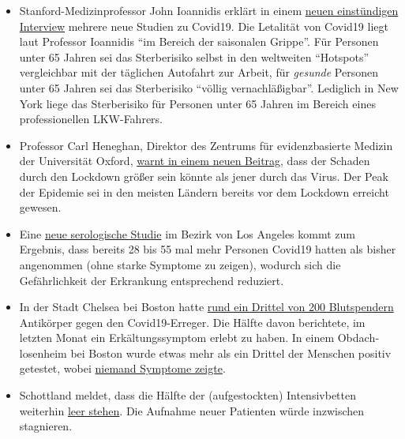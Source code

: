 \begin{itemize}
\tightlist
\item
  Stanford-Medizinprofessor John Ioannidis erklärt in einem
  \href{https://www.youtube.com/watch?v=cwPqmLoZA4s}{neuen einstündigen
  Interview} mehrere neue Studien zu Covid19. Die Letalität von Covid19
  liegt laut Professor Ioannidis ``im Bereich der saisonalen Grippe''.
  Für Personen unter 65 Jahren sei das Sterberisiko selbst in den
  weltweiten ``Hotspots'' vergleichbar mit der täglichen Autofahrt zur
  Arbeit, für \emph{gesunde} Personen unter 65 Jahren sei das
  Sterberisiko ``völlig vernachläßigbar''. Lediglich in New York liege
  das Sterberisiko für Personen unter 65 Jahren im Bereich eines
  professionellen LKW-Fahrers.
\item
  Professor Carl Heneghan, Direktor des Zentrums für evidenzbasierte
  Medizin der Universität Oxford,
  \href{https://news.yahoo.com/lockdown-damage-outweighs-coronavirus-warning-121940675.html}{warnt
  in einem neuen Beitrag}, dass der Schaden durch den Lockdown größer
  sein könnte als jener durch das Virus. Der Peak der Epidemie sei in
  den meisten Ländern bereits vor dem Lockdown erreicht gewesen.
\item
  Eine
  \href{http://publichealth.lacounty.gov/phcommon/public/media/mediapubhpdetail.cfm?prid=2328}{neue
  serologische Studie} im Bezirk von Los Angeles kommt zum Ergebnis,
  dass bereits 28 bis 55 mal mehr Personen Covid19 hatten als bisher
  angenommen (ohne starke Symptome zu zeigen), wodurch sich die
  Gefährlichkeit der Erkrankung entsprechend reduziert.
\item
  In der Stadt Chelsea bei Boston hatte
  \href{https://archive.is/20200418222442/https://www.bostonglobe.com/2020/04/17/business/nearly-third-200-blood-samples-taken-chelsea-show-exposure-coronavirus/}{rund
  ein Drittel von 200 Blutspendern} Antikörper gegen den
  Covid19-Erreger. Die Hälfte davon berichtete, im letzten Monat ein
  Erkältungs­symptom erlebt zu haben. In einem Obdach­losen­heim bei
  Boston wurde etwas mehr als ein Drittel der Menschen positiv getestet,
  wobei
  \href{https://www.wsbtv.com/news/trending/coronavirus-cdc-reviewing-stunning-universal-testing-results-boston-homeless-shelter/ZADQ45HCAZEVJAZA3OTCUR7M6M/}{niemand
  Symptome zeigte}.
\item
  Schottland meldet, dass die Hälfte der (aufgestockten) Intensivbetten
  weiterhin
  \href{https://www.heraldscotland.com/news/18377095.coronavirus-scotland-half-icu-beds-empty/}{leer
  stehen}. Die Aufnahme neuer Patienten würde inzwischen stagnieren.

\end{itemize}
